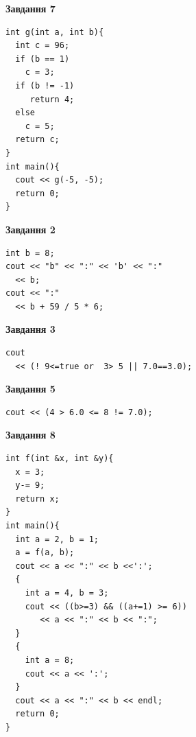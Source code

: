 \documentclass[12pt, ukrainian]{article}
\begin{document}
{\begin {large}
\begin{minipage}[t]{7.0cm}
\begin{center}
\textbf{Завдання 7}
\end{center}
\vspace{-8mm}

\begin{verbatim}
int g(int a, int b){
  int c = 96;
  if (b == 1)
    c = 3;
  if (b != -1)
     return 4;
  else
    c = 5;
  return c;
}
int main(){
  cout << g(-5, -5);
  return 0;
}
\end{verbatim}

\end{minipage}
\vline \hspace{1mm}
\begin{minipage}[t]{11.0cm}

\begin{center}
\textbf{Завдання 2}
\end{center}
\vspace{-8mm}

\begin{verbatim}
int b = 8;
cout << "b" << ":" << 'b' << ":" 
  << b;
cout << ":" 
  << b + 59 / 5 * 6;
\end{verbatim}



\begin{center}
\textbf{Завдання 3}
\end{center}
\vspace{-8mm}

\begin{verbatim}
cout 
  << (! 9<=true or  3> 5 || 7.0==3.0);
\end{verbatim}



\begin{center}
\textbf{Завдання 5}
\end{center}
\vspace{-8mm}

\begin{verbatim}
cout << (4 > 6.0 <= 8 != 7.0);
\end{verbatim}



\begin{center}
\textbf{Завдання 8}
\end{center}
\vspace{-8mm}

\begin{verbatim}
int f(int &x, int &y){
  x = 3;
  y-= 9;
  return x;
}
int main(){
  int a = 2, b = 1;
  a = f(a, b);
  cout << a << ":" << b <<':';
  {
    int a = 4, b = 3;
    cout << ((b>=3) && ((a+=1) >= 6))
       << a << ":" << b << ":";
  }
  {
    int a = 8;
    cout << a << ':';
  }
  cout << a << ":" << b << endl;
  return 0;
}
\end{verbatim}


\end{minipage}
\end{large}}
\end{document}

